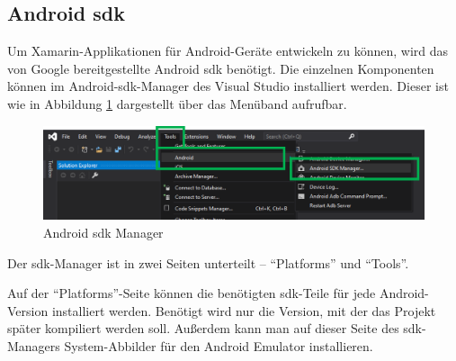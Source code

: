 \subsection{Android \ac{sdk}}
Um Xamarin-Applikationen für Android-Geräte entwickeln zu können, wird das von Google bereitgestellte Android \ac{sdk} benötigt.
Die einzelnen Komponenten können im Android-\ac{sdk}-Manager des Visual Studio installiert werden.
Dieser ist wie in Abbildung \ref{fig:android-sdk-manager} dargestellt über das Menüband aufrufbar.
\begin{figure}[htbp!]
    \centering\includegraphics[width=0.9\linewidth]{images/auswahl_rahmenwerk/android_sdk_installation.png}    
    \caption{Android \ac{sdk} Manager}
    \label{fig:android-sdk-manager}
\end{figure}

Der \ac{sdk}-Manager ist in zwei Seiten unterteilt -- \enquote{Platforms} und \enquote{Tools}.\par

Auf der \enquote{Plat\-forms}-Seite können die benötigten \ac{sdk}-Teile für jede Android-Version installiert werden.
Benötigt wird nur die Version, mit der das Projekt später kompiliert werden soll.
Außerdem kann man auf dieser Seite des \ac{sdk}-Managers System-Abbilder für den Android Emulator installieren.\par

